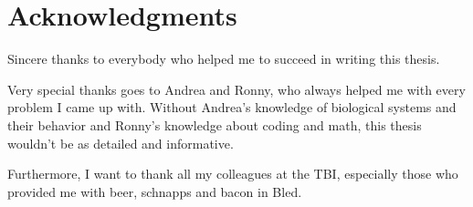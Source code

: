 


\begingroup
\let\clearpage\relax
\let\cleardoublepage\relax
\let\cleardoublepage\relax
\chapter*{Acknowledgments}
Sincere thanks to everybody who helped me to succeed in writing this thesis.




Very special thanks goes to Andrea and Ronny, who always helped me with every problem I came up with. Without Andrea's knowledge of biological systems and their behavior and Ronny's knowledge about coding and math, this thesis wouldn't be as detailed and informative.




Furthermore, I want to thank all my colleagues at the TBI, especially those who provided me with beer, schnapps and bacon in Bled.



\endgroup



